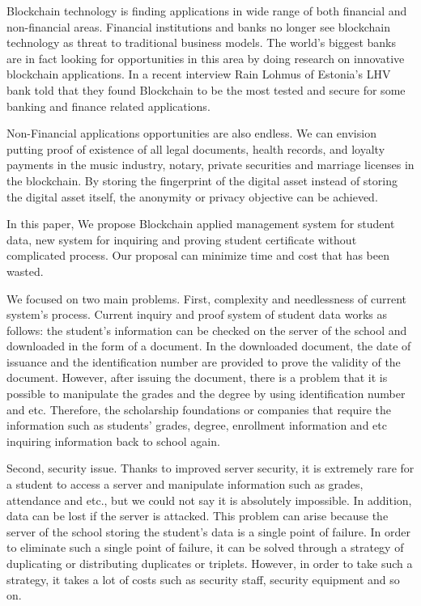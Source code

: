 \documentclass[conference]{IEEEtran}
\begin{document}
Blockchain technology is finding applications in wide range of both financial and non-financial areas. Financial institutions and banks no longer see blockchain technology as threat to traditional business models. The world’s biggest banks are in fact looking for opportunities in this area by doing research on innovative blockchain applications. In a recent interview Rain Lohmus of Estonia’s LHV bank told that they found Blockchain to be the most tested and secure for some banking and finance related applications. 

Non-Financial applications opportunities are also endless. We can envision putting proof of existence of all legal documents, health records, and loyalty payments in the music industry, notary, private securities and marriage licenses in the blockchain. By storing the fingerprint of the digital asset instead of storing the digital asset itself, the anonymity or privacy objective can be achieved.

In this paper, We propose Blockchain applied management system for student data, new system for inquiring and proving student certificate without complicated process. Our proposal can minimize time and cost that has been wasted.

We focused on two main problems. First, complexity and needlessness of current system's process. Current inquiry and proof system of student data works as follows: the student's information can be checked on the server of the school and downloaded in the form of a document. In the downloaded document, the date of issuance and the identification number are provided to prove the validity of the document. However, after issuing the document, there is a problem that it is possible to manipulate the grades and the degree by using identification number and etc. Therefore, the scholarship foundations or companies that require the information such as students' grades, degree, enrollment information and etc inquiring information back to school again. 

Second, security issue. Thanks to improved server security, it is extremely rare for a student to access a server and manipulate information such as grades, attendance and etc., but we could not say it is absolutely impossible.
In addition, data can be lost if the server is attacked. This problem can arise because the server of the school storing the student's data is a single point of failure. In order to eliminate such a single point of failure, it can be solved through a strategy of duplicating or distributing duplicates or triplets. However, in order to take such a strategy, it takes a lot of costs such as security staff, security equipment and so on. 
\end{document}
